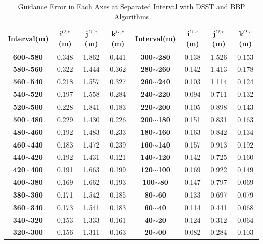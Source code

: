 \documentclass[journal,article,submit,moreauthors,pdftex,10pt,a4paper]{mdpi}
\begin{document}
\begin{table}[!th]
	\centering
	\caption{Guidance Error in Each Axes at Separated Interval with DSST and BBP Algorithms}
	\label{lab:ground_landing}
	\begin{tabular}{cccc|cccc}
		\hline
		\textbf{Interval(m)} & \textbf{$\mathbf{i}^{O,c}$(m)} & \textbf{$\mathbf{j}^{O,c}$(m)} & \textbf{$\mathbf{k}^{O,c}$(m)} & \textbf{Interval(m)} & \textbf{$\mathbf{i}^{O,c}$(m)} & \textbf{$\mathbf{j}^{O,c}$(m)} & \textbf{$\mathbf{k}^{O,c}$(m)} \\ \hline
		\textbf{600$\sim$580} & 0.348 & 1.862 & 0.441 & \textbf{300$\sim$280} & 0.138 & 1.526 & 0.153\\
		\textbf{580$\sim$560} & 0.322 & 1.444 & 0.362 & \textbf{280$\sim$260} & 0.142 & 1.413 & 0.178 \\
		\textbf{560$\sim$540} & 0.218 & 1.557 & 0.327 & \textbf{260$\sim$240} & 0.103 & 1.114 & 0.124 \\
		\textbf{540$\sim$520} & 0.197 & 1.558 & 0.284 & \textbf{240$\sim$220} & 0.094 & 0.711 & 0.132 \\
		\textbf{520$\sim$500} & 0.228 & 1.841 & 0.183 & \textbf{220$\sim$200} & 0.105 & 0.898 & 0.143 \\
		\textbf{500$\sim$480} & 0.229 & 1.430 & 0.226 & \textbf{200$\sim$180} & 0.151 & 0.831 & 0.163 \\
		\textbf{480$\sim$460} & 0.192 & 1.483 & 0.233 & \textbf{180$\sim$160} & 0.163 & 0.842 & 0.134 \\
		\textbf{460$\sim$440} & 0.183 & 1.472 & 0.239 & \textbf{160$\sim$140} & 0.157 & 0.913 & 0.192 \\
		\textbf{440$\sim$420} & 0.192 & 1.431 & 0.121 & \textbf{140$\sim$120} & 0.142 & 0.725 & 0.160 \\
		\textbf{420$\sim$400} & 0.191 & 1.663 & 0.199 & \textbf{120$\sim$100} & 0.169 & 0.922 & 0.149 \\
		\textbf{400$\sim$380} & 0.169 & 1.662 & 0.193 & \textbf{100$\sim$80} & 0.147 & 0.797 & 0.069 \\
		\textbf{380$\sim$360} & 0.171 & 1.542 & 0.185 & \textbf{80$\sim$60} & 0.133 & 0.697 & 0.079 \\
		\textbf{360$\sim$340} & 0.173 & 1.541 & 0.183 & \textbf{60$\sim$40} & 0.114 & 0.441 & 0.068 \\
		\textbf{340$\sim$320} & 0.153 & 1.333 & 0.161 & \textbf{40$\sim$20} & 0.124 & 0.312 & 0.064 \\
		\textbf{320$\sim$300} & 0.156 & 1.311 & 0.163 & \textbf{20$\sim$00} & 0.082 & 0.284 & 0.103 \\ \hline
	\end{tabular}
\end{table}
\end{document}
